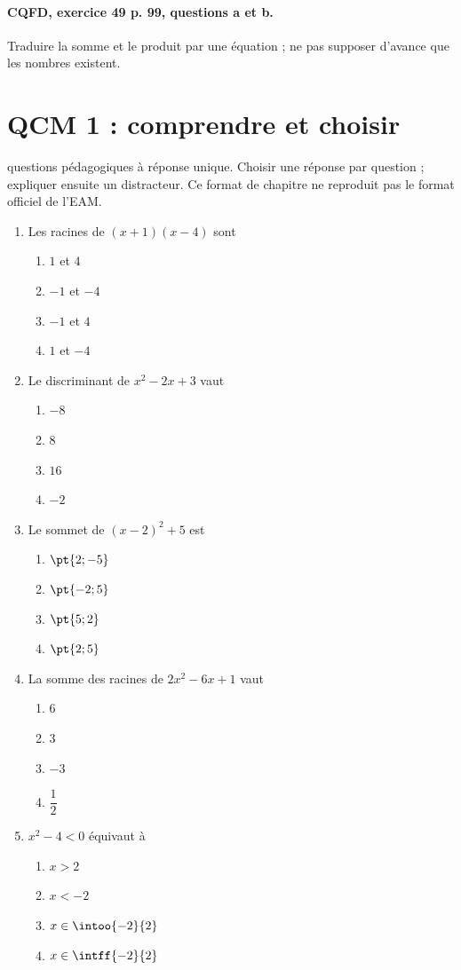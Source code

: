 \paragraph{CQFD, exercice 49 p. 99, questions a et b.}\label{C02-M2} Traduire la somme et le produit par une équation ; ne pas supposer d’avance que les nombres existent.
\begingroup\small
\mxnewpage\section*{QCM 1 : comprendre et choisir}\label{C02-Q1}
 questions pédagogiques à réponse unique. Choisir une réponse par question ; expliquer ensuite un distracteur. Ce format de chapitre ne reproduit pas le format officiel de l’EAM.
\begin{enumerate}
\item Les racines de $(x+1)(x-4)$ sont
\begin{enumerate}[label=\Alph*.,itemsep=2pt]
\item $1$ et $4$
\item $-1$ et $-4$
\item $-1$ et $4$
\item $1$ et $-4$
\end{enumerate}
\item Le discriminant de $x^2-2x+3$ vaut
\begin{enumerate}[label=\Alph*.,itemsep=2pt]
\item $-8$
\item $8$
\item $16$
\item $-2$
\end{enumerate}
\item Le sommet de $(x-2)^2+5$ est
\begin{enumerate}[label=\Alph*.,itemsep=2pt]
\item $\pt{2;-5}$
\item $\pt{-2;5}$
\item $\pt{5;2}$
\item $\pt{2;5}$
\end{enumerate}
\item La somme des racines de $2x^2-6x+1$ vaut
\begin{enumerate}[label=\Alph*.,itemsep=2pt]
\item $6$
\item $3$
\item $-3$
\item $\dfrac{1}{2}$
\end{enumerate}
\item $x^2-4<0$ équivaut à
\begin{enumerate}[label=\Alph*.,itemsep=2pt]
\item $x>2$
\item $x<-2$
\item $x\in\intoo{-2}{2}$
\item $x\in\intff{-2}{2}$
\end{enumerate}
\end{enumerate}
